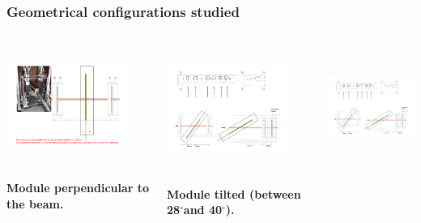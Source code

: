 \documentclass{beamer}
\newcommand{\degres}{\ensuremath{^\circ}}
\begin{document}
  \begin{frame}
    \frametitle{Geometrical configurations studied}

    \vspace{-0.1cm}
    \begin{columns}[t]
      \begin{column}{4cm}
        \begin{center}
          \includegraphics[width = 4cm,height = 3.9cm]{Pictures/tb_cern_11_sketch_normal.pdf}

          \footnotesize{\textbf{Module perpendicular to the beam.}}
        \end{center}
      \end{column}

      \begin{column}{4cm}
        \begin{center}
          \includegraphics[width = 4cm,height = 4.1cm]{Pictures/tb_cern_11_sketch_tilted.pdf}

          \vspace{-0.2cm}
          \footnotesize{\textbf{Module tilted (between 28\degres and 40\degres).}}
        \end{center}
      \end{column}

      \begin{column}{4cm}
        \begin{center}
          \includegraphics[width = 4cm,height = 4.0cm]{Pictures/tb_cern_11_sketch_tilted120mm.pdf}


\end{center}
\end{column}
\end{columns}
\end{frame}
\end{document}
